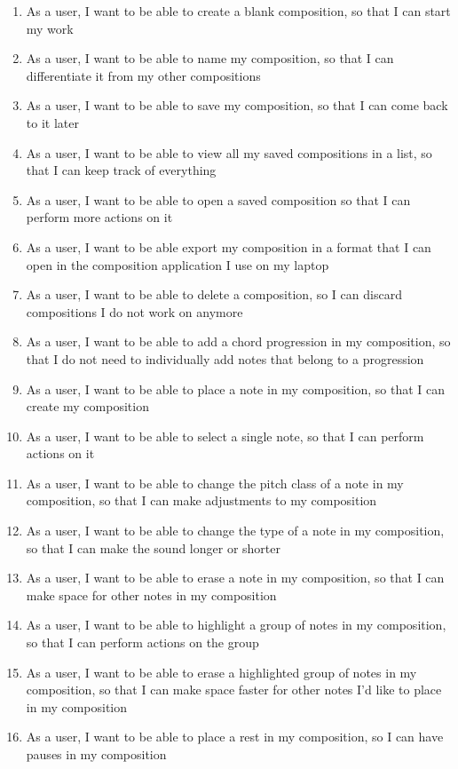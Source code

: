 \begin{enumerate}
\item As a user, I want to be able to create a blank composition, so that I can start my work
\item As a user, I want to be able to name my composition, so that I can differentiate it from my other compositions
\item As a user, I want to be able to save my composition, so that I can come back to it later
\item As a user, I want to be able to view all my saved compositions in a list, so that I can keep track of everything
\item As a user, I want to be able to open a saved composition so that I can perform more actions on it
\item As a user, I want to be able export my composition in a format that I can open in the composition application I use on my laptop
\item As a user, I want to be able to delete a composition, so I can discard compositions I do not work on anymore
\item As a user, I want to be able to add a chord progression in my composition, so that I do not need to individually add notes that belong to a progression
\item As a user, I want to be able to place a note in my composition, so that I can create my composition
\item As a user, I want to be able to select a single note, so that I can perform actions on it
\item As a user, I want to be able to change the pitch class of a note in my composition, so that I can make adjustments to my composition
\item As a user, I want to be able to change the type of a note in my composition, so that I can make the sound longer or shorter
\item As a user, I want to be able to erase a note in my composition, so that I can make space for other notes in my composition
\item As a user, I want to be able to highlight a group of notes in my composition, so that I can perform actions on the group
\item As a user, I want to be able to erase a highlighted group of notes in my composition, so that I can make space faster for other notes I'd like to place in my composition
\item As a user, I want to be able to place a rest in my composition, so I can have pauses in my composition

\end{enumerate}
